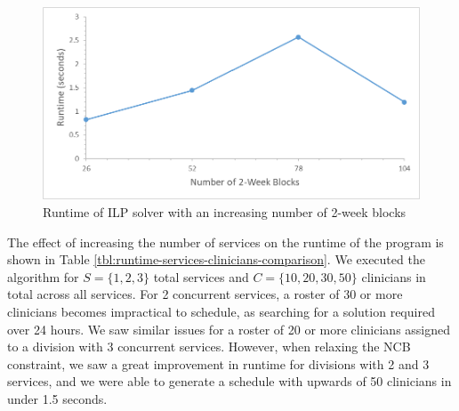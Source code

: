 \begin{figure}[h]
	\centering
	\includegraphics[scale=.5]{fig/runtime_blocks}
	\caption{Runtime of ILP solver with an increasing number of 2-week blocks}
	\label{fig:runtime-blocks}
\end{figure}

The effect of increasing the number of services %
on the runtime of the program is shown in Table
\ref{tbl:runtime-services-clinicians-comparison}. We executed the algorithm for
$S = \{1, 2, 3\}$ total services and $C = \{10, 20, 30, 50\}$ clinicians in
total across all services. For 2 concurrent services, a roster of 30 or more
clinicians becomes impractical to schedule, as searching for a solution required
over 24 hours. We saw similar issues for a roster of 20 or more clinicians
assigned to a division with 3 concurrent services. However, when relaxing the
NCB constraint, we saw a great improvement in runtime for divisions with 2 and 3
services, and we were able to generate a schedule with upwards of 50 clinicians
in under 1.5 seconds. \\  %


